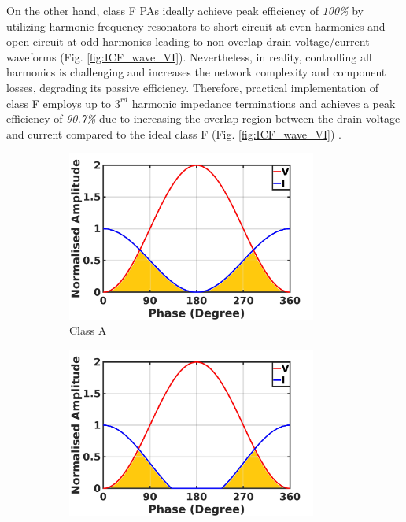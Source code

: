 \documentclass[conference]{IEEEtran}
\begin{document}
On the other hand, class F PAs ideally achieve peak efficiency of \textit{100\%} by utilizing harmonic-frequency resonators to short-circuit at even harmonics and open-circuit at odd harmonics leading to non-overlap drain voltage/current waveforms (Fig. \ref{fig:ICF_wave_VI}). Nevertheless, in reality, controlling all harmonics is challenging and increases the network complexity and component losses, degrading its passive efficiency. Therefore, practical implementation of class F employs up to $3^{rd}$ harmonic impedance terminations and achieves a peak efficiency of \textit{90.7\%} due to increasing the overlap region between the drain voltage and current compared to the ideal class F (Fig. \ref{fig:ICF_wave_VI}) \cite{Raab_max_eff}.
\begin{figure}[!t]
\centering
\captionsetup{font=footnotesize}
\begin{subfigure}{0.24\textwidth}
\includegraphics[width=0.9\textwidth]{Images/Intro/ClassA_shaded.jpg}
\caption{Class A}
\label{fig:CA_wave_VI}
\end{subfigure}
\begin{subfigure}{0.24\textwidth}
\includegraphics[width=0.9\textwidth]{Images/Intro/ClassB_shaded.jpg}

\end{subfigure}
\end{figure}
\end{document}
